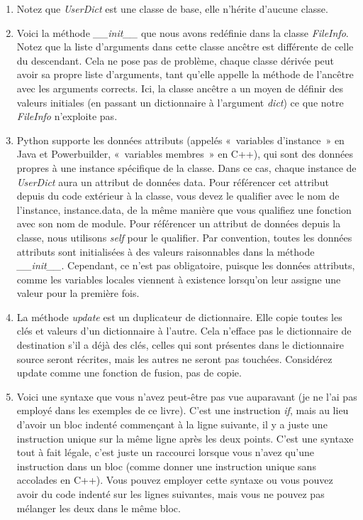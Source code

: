 \begin{enumerate}
\item{Notez que \emph{UserDict} est une classe de base, elle n'hérite d'aucune classe.}
\item{Voici la méthode \emph{\_\_init\_\_} que nous avons redéfinie dans la classe \emph{FileInfo}. Notez que la liste d'arguments dans cette classe ancêtre est différente de celle du descendant. Cela ne pose pas de problème, chaque classe dérivée peut avoir sa propre liste d'arguments, tant qu'elle appelle la méthode de l'ancêtre avec les arguments corrects. Ici, la classe ancêtre a un moyen de définir des valeurs initiales (en passant un dictionnaire à l'argument \emph{dict}) ce que notre \emph{FileInfo} n'exploite pas.}
\item{Python supporte les données attributs (appelés «~variables d'instance~» en Java et Powerbuilder, «~variables membres~» en C++), qui sont des données propres à une instance spécifique de la classe. Dans ce cas, chaque instance de \emph{UserDict} aura un attribut de données data. Pour référencer cet attribut depuis du code extérieur à la classe, vous devez le qualifier avec le nom de l'instance, instance.data, de la même manière que vous qualifiez une fonction avec son nom de module. Pour référencer un attribut de données depuis la classe, nous utilisons \emph{self} pour le qualifier. Par convention, toutes les données attributs sont initialisées à des valeurs raisonnables dans la méthode \emph{\_\_init\_\_}. Cependant, ce n'est pas obligatoire, puisque les données attributs, comme les variables locales viennent à existence lorsqu'on leur assigne une valeur pour la première fois.}
\item{La méthode \emph{update} est un duplicateur de dictionnaire. Elle copie toutes les clés et valeurs d'un dictionnaire à l'autre. Cela n'efface pas le dictionnaire de destination s’il a déjà des clés, celles qui sont présentes dans le dictionnaire source seront récrites, mais les autres ne seront pas touchées. Considérez update comme une fonction de fusion, pas de copie.}
\item{Voici une syntaxe que vous n'avez peut-être pas vue auparavant (je ne l'ai pas employé dans les exemples de ce livre). C'est une instruction \emph{if}, mais au lieu d'avoir un bloc indenté commençant à la ligne suivante, il y a juste une instruction unique sur la même ligne après les deux points. C'est une syntaxe tout à fait légale, c'est juste un raccourci lorsque vous n'avez qu'une instruction dans un bloc (comme donner une instruction unique sans accolades en C++). Vous pouvez employer cette syntaxe ou vous pouvez avoir du code indenté sur les lignes suivantes, mais vous ne pouvez pas mélanger les deux dans le même bloc.}
\end{enumerate}

